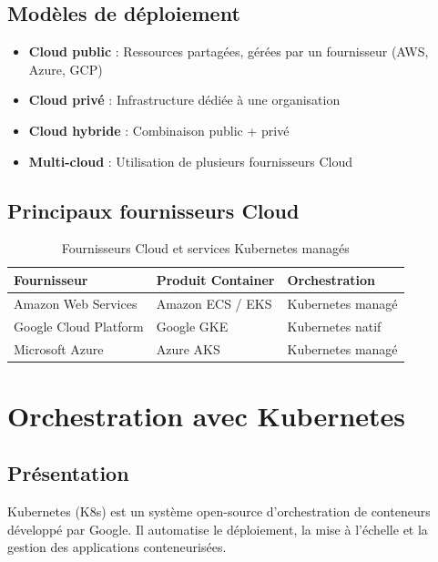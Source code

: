 \documentclass[12pt,a4paper]{article}
\begin{document}
\subsection{Modèles de déploiement}

\begin{itemize}
    \item \textbf{Cloud public} : Ressources partagées, gérées par un fournisseur (AWS, Azure, GCP)
    \item \textbf{Cloud privé} : Infrastructure dédiée à une organisation
    \item \textbf{Cloud hybride} : Combinaison public + privé
    \item \textbf{Multi-cloud} : Utilisation de plusieurs fournisseurs Cloud
\end{itemize}

\subsection{Principaux fournisseurs Cloud}

\begin{table}[H]
\centering
\begin{tabular}{@{}lll@{}}
\toprule
\textbf{Fournisseur} & \textbf{Produit Container} & \textbf{Orchestration} \\
\midrule
Amazon Web Services & Amazon ECS / EKS & Kubernetes managé \\
Google Cloud Platform & Google GKE & Kubernetes natif \\
Microsoft Azure & Azure AKS & Kubernetes managé \\
\bottomrule
\end{tabular}
\caption{Fournisseurs Cloud et services Kubernetes managés}
\end{table}

\section{Orchestration avec Kubernetes}

\subsection{Présentation}

Kubernetes (K8s) est un système open-source d'orchestration de conteneurs développé par Google. Il automatise le déploiement, la mise à l'échelle et la gestion des applications conteneurisées.
\end{document}

